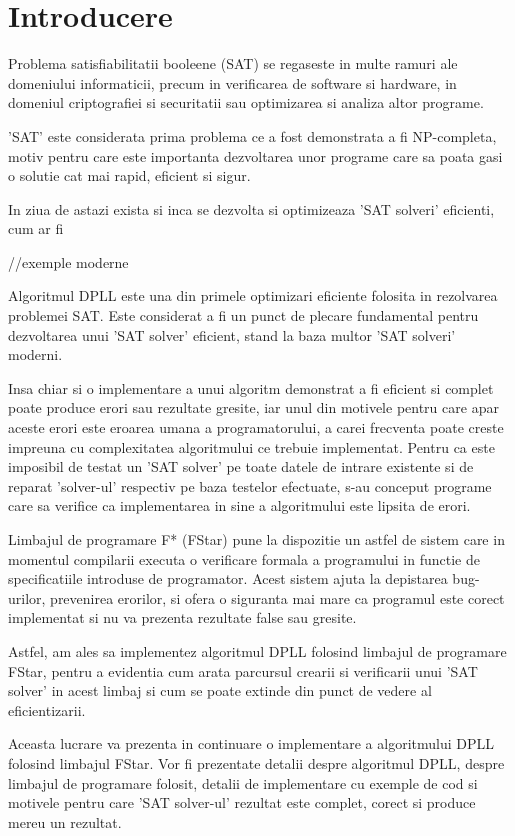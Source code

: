 \chapter*{Introducere} 

Problema satisfiabilitatii booleene (SAT) se regaseste in multe ramuri ale domeniului informaticii, precum in verificarea de software si hardware, in domeniul criptografiei si securitatii sau optimizarea si analiza altor programe.


'SAT' este considerata prima problema ce a fost demonstrata a fi NP-completa, motiv pentru care este importanta dezvoltarea unor programe care sa poata gasi o solutie cat mai rapid, eficient si sigur. 

In ziua de astazi exista si inca se dezvolta si optimizeaza 'SAT solveri' eficienti, cum ar fi

//exemple moderne

Algoritmul DPLL este una din primele optimizari eficiente folosita in rezolvarea problemei SAT. Este considerat a fi un punct de plecare fundamental pentru dezvoltarea unui 'SAT solver' eficient, stand la baza multor 'SAT solveri' moderni.

Insa chiar si o implementare a unui algoritm demonstrat a fi eficient si complet poate produce erori sau rezultate gresite, iar unul din motivele pentru care apar aceste erori este eroarea umana a programatorului, a carei frecventa poate creste impreuna cu complexitatea algoritmului ce trebuie implementat. Pentru ca este imposibil de testat un 'SAT solver' pe toate datele de intrare existente si de reparat 'solver-ul' respectiv pe baza testelor efectuate, s-au conceput programe care sa verifice ca implementarea in sine a algoritmului este lipsita de erori.

Limbajul de programare F* (FStar) pune la dispozitie un astfel de sistem care in momentul compilarii executa o verificare formala a programului in functie de specificatiile introduse de programator. Acest sistem ajuta la depistarea bug-urilor, prevenirea erorilor, si ofera o siguranta mai mare ca programul este corect implementat si nu va prezenta rezultate false sau gresite.

Astfel, am ales sa implementez algoritmul DPLL folosind limbajul de programare FStar, pentru a evidentia cum arata parcursul crearii si verificarii unui 'SAT solver' in acest limbaj si cum se poate extinde din punct de vedere al eficientizarii.

Aceasta lucrare va prezenta in continuare o implementare a algoritmului DPLL folosind limbajul FStar. Vor fi prezentate detalii despre algoritmul DPLL, despre limbajul de programare folosit, detalii de implementare cu exemple de cod si motivele pentru care 'SAT solver-ul' rezultat este complet, corect si produce mereu un rezultat.


